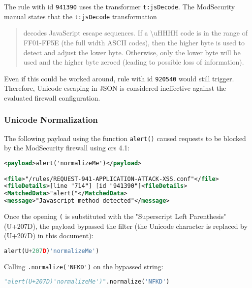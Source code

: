 The rule with id \verb|941390| uses the transformer \verb|t:jsDecode|. 
The ModSecurity manual states that the \verb|t:jsDecode| transformation

\begin{quote}
	decodes JavaScript escape sequences. If a \textbackslash uHHHH code is in the range of FF01-FF5E (the full width ASCII codes), then the higher byte is used to detect and adjust the lower byte. Otherwise, only the lower byte will be used and the higher byte zeroed (leading to possible loss of information). \cite{modsec/transjsdecode}
\end{quote}

Even if this could be worked around, rule with id \verb|920540| would still trigger.
Therefore, Unicode escaping in JSON is considered ineffective against the evaluated firewall configuration.

\subsubsection{Unicode Normalization}
\label{sec:uninormsingleiter}
The following payload using the function \verb|alert()| caused requests to be blocked by the ModSecurity firewall using \acrshort{crs} 4.1:

\begin{lstlisting}[style=ruleStyle, language=XML, caption=alert('normalizeMe') blocked]
<payload>alert('normalizeMe')</payload>

<file>"/rules/REQUEST-941-APPLICATION-ATTACK-XSS.conf"</file>
<fileDetails>[line "714"] [id "941390"]<fileDetails>
<MatchedData>"alert("</MatchedData>
<message>"Javascript method detected"</message>
\end{lstlisting}

Once the opening \verb|(| is substituted with the "Superscript Left Parenthesis" (U+207D), the payload bypassed the filter (the Unicode character is replaced by (U+207D) in this document):

\begin{lstlisting}[style=basicStyle, caption=alert(U+207D)'normalizeMe') bypass, label=lst:alertnormalizemebypass, language=Python]
alert(U+207D)'normalizeMe')
\end{lstlisting}

Calling \verb|.normalize('NFKD')| on the bypassed string:

\begin{lstlisting}[style=basicStyle, language=Python]
"alert(U+207D)'normalizeMe')".normalize('NFKD')
\end{lstlisting}

